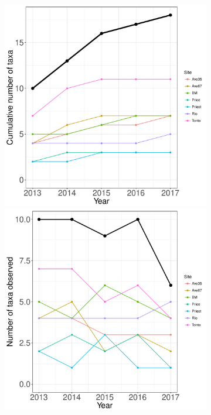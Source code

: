 \documentclass[11pt, oneside]{article}
\begin{document}
\begin{figure}[h!]
\begin{figure}[h!]
\centering
\includegraphics[scale = 0.4]{cap-herps-banville_species_accumulation_curve.pdf}
\includegraphics[scale = 0.4]{cap-herps-banville_num_taxa_over_time.pdf}

\end{figure}
\end{figure}
\end{document}
